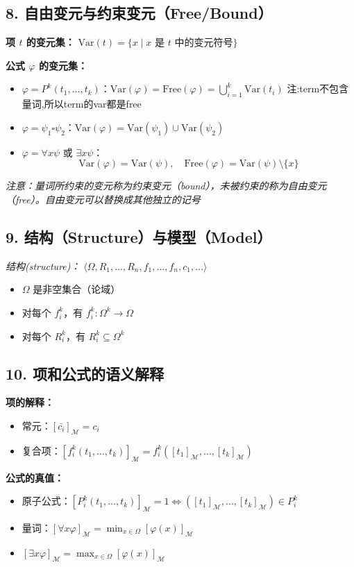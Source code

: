 \documentclass[12pt, a4paper]{article}
\begin{document}
\subsection*{8. 自由变元与约束变元（Free/Bound）}
\textbf{项 \(t\) 的变元集：} \(\text{Var}(t) = \{x \mid x \text{ 是 } t \text{ 中的变元符号}\}\)

\textbf{公式 \(\varphi\) 的变元集：}
\begin{itemize}
    \item \(\varphi = P^k(t_1, \dots, t_k)\)：\(\text{Var}(\varphi) = \text{Free}(\varphi) = \bigcup_{i=1}^k \text{Var}(t_i)\) 注:term不包含量词,所以term的var都是free
    \item \(\varphi = \psi_1 \square \psi_2\)：\(\text{Var}(\varphi) = \text{Var}(\psi_1) \cup \text{Var}(\psi_2)\)
    \item \(\varphi = \forall x \psi\) 或 \(\exists x \psi\)：
    \[
    \text{Var}(\varphi) = \text{Var}(\psi), \quad \text{Free}(\varphi) = \text{Var}(\psi) \setminus \{x\}
    \]
\end{itemize}
\textit{注意：量词所约束的变元称为约束变元（bound），未被约束的称为自由变元（free）。自由变元可以替换成其他独立的记号}

\subsection*{9. 结构（Structure）与模型（Model）}
\textit{结构(structure)：} \(\langle \Omega, R_1, \dots, R_n, f_1, \dots, f_n, c_1, \dots \rangle\)
\begin{itemize}
    \item \(\Omega\) 是非空集合（论域）
    \item 对每个 \(f_i^k\)，有 \(f_i^k: \Omega^k \to \Omega\)
    \item 对每个 \(R_i^k\)，有 \(R_i^k \subseteq \Omega^k\)
\end{itemize}


\subsection*{10. 项和公式的语义解释}
\textbf{项的解释：}
\begin{itemize}
    \item 常元：\([\bar{c_i}]_\mathcal{M} = c_i\)
    \item 复合项：\([f_i^k(t_1, \dots, t_k)]_\mathcal{M} = f_i^k([t_1]_\mathcal{M}, \dots, [t_k]_\mathcal{M})\)
\end{itemize}

\textbf{公式的真值：}
\begin{itemize}
    \item 原子公式：\([P_i^k(t_1, \dots, t_k)]_\mathcal{M} = 1 \iff ([t_1]_\mathcal{M}, \dots, [t_k]_\mathcal{M}) \in P_i^k\)
    \item 量词：\([\forall x \varphi]_\mathcal{M} = \min_{x \in \Omega} [\varphi(x)]_\mathcal{M}\)
    \item \([\exists x \varphi]_\mathcal{M} = \max_{x \in \Omega} [\varphi(x)]_\mathcal{M}\)
\end{itemize}
\end{document}
